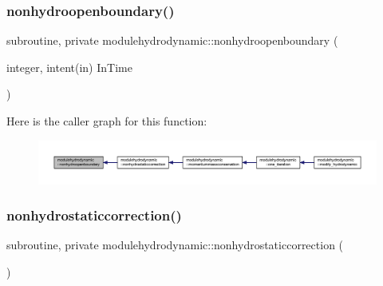 \subsubsection{\texorpdfstring{nonhydroopenboundary()}{nonhydroopenboundary()}}
{\footnotesize\ttfamily subroutine, private modulehydrodynamic\+::nonhydroopenboundary (\begin{DoxyParamCaption}\item[{integer, intent(in)}]{In\+Time }\end{DoxyParamCaption})\hspace{0.3cm}{\ttfamily [private]}}

Here is the caller graph for this function\+:\nopagebreak
\begin{figure}[H]
\begin{center}
\leavevmode
\includegraphics[width=350pt]{namespacemodulehydrodynamic_aa8e7eaaf3d7106144fb138675637be7e_icgraph}
\end{center}
\end{figure}
\mbox{\label{namespacemodulehydrodynamic_abc8e7cbc6bd77b58f41b41db117c979b}} 
\subsubsection{\texorpdfstring{nonhydrostaticcorrection()}{nonhydrostaticcorrection()}}
{\footnotesize\ttfamily subroutine, private modulehydrodynamic\+::nonhydrostaticcorrection (\begin{DoxyParamCaption}{ }\end{DoxyParamCaption})\hspace{0.3cm}{\ttfamily [private]}}

